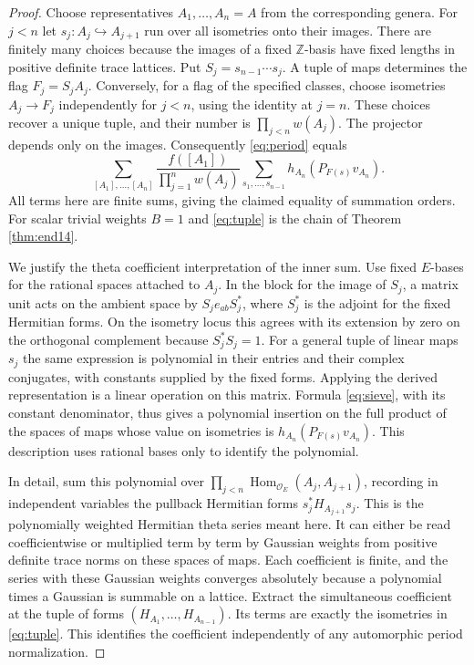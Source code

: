 \documentclass[a4paper,11pt]{article}
\theoremstyle{definition}
\theoremstyle{remark}
\newcommand{\ZZ}{\mathbb Z}\newcommand{\ord}{\operatorname{ord}}
\numberwithin{equation}{section}
\newcommand{\OO}{\mathcal O}
\begin{document}
\begin{proof}
Choose representatives \(A_1,\ldots,A_n=A\) from the corresponding genera. For \(j<n\) let \(s_j:A_j\hookrightarrow A_{j+1}\) run over all isometries onto their images. There are finitely many choices because the images of a fixed \(\ZZ\)-basis have fixed lengths in positive definite trace lattices. Put \(S_j=s_{n-1}\cdots s_j\). A tuple of maps determines the flag \(F_j=S_j A_j\). Conversely, for a flag of the specified classes, choose isometries \(A_j\to F_j\) independently for \(j<n\), using the identity at \(j=n\). These choices recover a unique tuple, and their number is \(\prod_{j<n}w(A_j)\). The projector depends only on the images. Consequently \eqref{eq:period} equals
\begin{equation}
 \sum_{[A_1],\ldots,[A_n]}
    \frac{f([A_1])}{\prod_{j=1}^{n}w(A_j)}
      \sum_{s_1,\ldots,s_{n-1}}h_{A_n}(P_{F(s)}v_{A_n}).
 \label{eq:tuple}
\end{equation}
All terms here are finite sums, giving the claimed equality of summation orders. For scalar trivial weights \(B=1\) and \eqref{eq:tuple} is the chain of Theorem \ref{thm:end14}.

We justify the theta coefficient interpretation of the inner sum. Use fixed \(E\)-bases for the rational spaces attached to \(A_j\). In the block for the image of \(S_j\), a matrix unit acts on the ambient space by \(S_j e_{ab} S_j^*\), where \(S_j^*\) is the adjoint for the fixed Hermitian forms. On the isometry locus this agrees with its extension by zero on the orthogonal complement because \(S_j^*S_j=1\). For a general tuple of linear maps \(s_j\) the same expression is polynomial in their entries and their complex conjugates, with constants supplied by the fixed forms. Applying the derived representation is a linear operation on this matrix. Formula \eqref{eq:sieve}, with its constant denominator, thus gives a polynomial insertion on the full product of the spaces of maps whose value on isometries is \(h_{A_n}(P_{F(s)}v_{A_n})\). This description uses rational bases only to identify the polynomial.

In detail, sum this polynomial over \(\prod_{j<n}\operatorname{Hom}_{\OO_E}(A_j,A_{j+1})\), recording in independent variables the pullback Hermitian forms \(s_j^*H_{A_{j+1}}s_j\). This is the polynomially weighted Hermitian theta series meant here. It can either be read coefficientwise or multiplied term by term by Gaussian weights from positive definite trace norms on these spaces of maps. Each coefficient is finite, and the series with these Gaussian weights converges absolutely because a polynomial times a Gaussian is summable on a lattice. Extract the simultaneous coefficient at the tuple of forms \((H_{A_1},\ldots,H_{A_{n-1}})\). Its terms are exactly the isometries in \eqref{eq:tuple}. This identifies the coefficient independently of any automorphic period normalization.


\end{proof}
\end{document}
